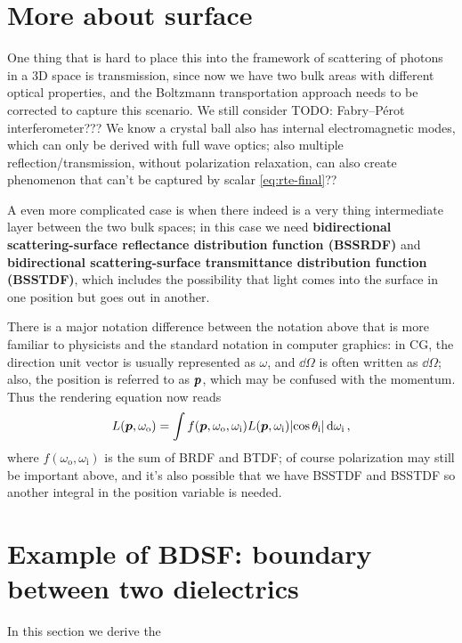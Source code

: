 \documentclass[hyperref, a4paper]{article}
\newcommand*{\concept}[1]{{\textbf{#1}}}
\begin{document}
\section{More about surface}


One thing that is hard to place this into the framework 
of scattering of photons in a 3D space
is transmission, 
since now we have two bulk areas with different optical properties,
and the Boltzmann transportation approach needs to be corrected 
to capture this scenario.
We still consider TODO: Fabry–Pérot interferometer??? We know a crystal ball also has internal electromagnetic modes, which can only be derived with full wave optics; 
also multiple reflection/transmission, 
without polarization relaxation,
can also create phenomenon that can't be captured by scalar \eqref{eq:rte-final}??

A even more complicated case is when there indeed is 
a very thing intermediate layer between the two bulk spaces; 
in this case we need \concept{bidirectional scattering-surface reflectance distribution function (BSSRDF)}
and \concept{bidirectional scattering-surface transmittance distribution function (BSSTDF)},
which includes the possibility that light comes into the surface in one position 
but goes out in another.

There is a major notation difference between the notation above that is more familiar to physicists
and the standard notation in computer graphics:
in CG, the direction unit vector is usually represented as $\omega$, 
and $\dd{\Omega}$ is often written as $\dd{\Omega}$;
also, the position is referred to as $\vb*{p}$, 
which may be confused with the momentum.
Thus the rendering equation now reads 
\begin{equation}
    L(\vb*{p}, \omega_{\text{o}}) 
    = \int f(\vb*{p}, \omega_{\text{o}}, \omega_{\text{i}}) 
    L(\vb*{p}, \omega_{\text{i}}) \abs{\cos \theta_{\text{i}}} \dd{\omega_{\text{i}}},
\end{equation}
where $f(\omega_{\text{o}}, \omega_{\text{i}})$ 
is the sum of BRDF and BTDF; 
of course polarization may still be important above, 
and it's also possible that we have BSSTDF and BSSTDF 
so another integral in the position variable is needed.

\section{Example of BDSF: boundary between two dielectrics}

In this section we derive the 
\end{document}
